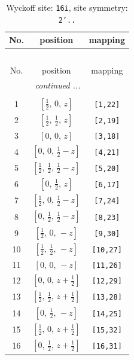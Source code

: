 \documentclass[fleqn,8pt]{jsarticle}
\begin{document}
\begin{longtable}{ccc}
\caption{Wyckoff site: {\tt 16i}, site symmetry: {\tt 2'..}}
 \\
 \hline \hline
No. & position & mapping \\ \hline \endfirsthead

\multicolumn{2}{l}{\tablename\ \thetable{}} \\
 \hline \hline
No. & position & mapping \\ \hline \endhead

 \hline \hline
\multicolumn{2}{r}{\footnotesize\it continued ...} \\ \endfoot

 \hline \hline
\multicolumn{2}{r}{} \\ \endlastfoot

1 & $\left[ \frac{1}{2},\, 0,\, z \right]$ & {\tt [1,22]} \\ \hline
2 & $\left[ \frac{1}{2},\, \frac{1}{2},\, z \right]$ & {\tt [2,19]} \\ \hline
3 & $\left[ 0,\, 0,\, z \right]$ & {\tt [3,18]} \\ \hline
4 & $\left[ 0,\, 0,\, \frac{1}{2} - z \right]$ & {\tt [4,21]} \\ \hline
5 & $\left[ \frac{1}{2},\, \frac{1}{2},\, \frac{1}{2} - z \right]$ & {\tt [5,20]} \\ \hline
6 & $\left[ 0,\, \frac{1}{2},\, z \right]$ & {\tt [6,17]} \\ \hline
7 & $\left[ \frac{1}{2},\, 0,\, \frac{1}{2} - z \right]$ & {\tt [7,24]} \\ \hline
8 & $\left[ 0,\, \frac{1}{2},\, \frac{1}{2} - z \right]$ & {\tt [8,23]} \\ \hline
9 & $\left[ \frac{1}{2},\, 0,\, - z \right]$ & {\tt [9,30]} \\ \hline
10 & $\left[ \frac{1}{2},\, \frac{1}{2},\, - z \right]$ & {\tt [10,27]} \\ \hline
11 & $\left[ 0,\, 0,\, - z \right]$ & {\tt [11,26]} \\ \hline
12 & $\left[ 0,\, 0,\, z + \frac{1}{2} \right]$ & {\tt [12,29]} \\ \hline
13 & $\left[ \frac{1}{2},\, \frac{1}{2},\, z + \frac{1}{2} \right]$ & {\tt [13,28]} \\ \hline
14 & $\left[ 0,\, \frac{1}{2},\, - z \right]$ & {\tt [14,25]} \\ \hline
15 & $\left[ \frac{1}{2},\, 0,\, z + \frac{1}{2} \right]$ & {\tt [15,32]} \\ \hline
16 & $\left[ 0,\, \frac{1}{2},\, z + \frac{1}{2} \right]$ & {\tt [16,31]} \\
\end{longtable}
\end{document}
